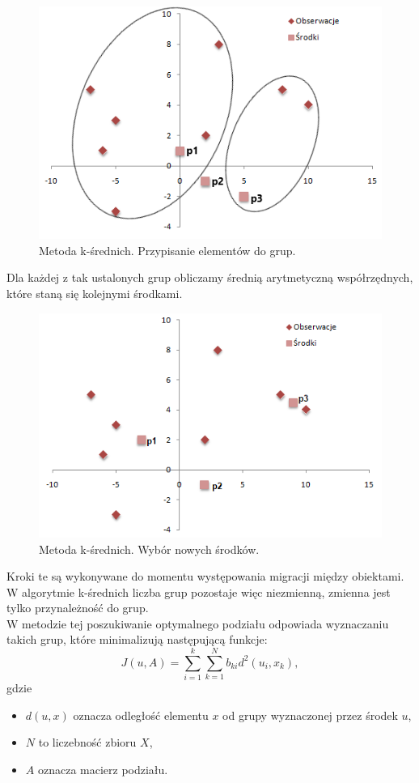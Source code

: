 \documentclass[12pt,a4paper]{report}
\begin{document}
\begin{center}
\begin{figure}[H]
\centering
\includegraphics[scale=0.8]{ks_1.png} 
\caption{Metoda k-średnich. Przypisanie elementów do grup.}
\end{figure}
\end{center}
Dla każdej z tak ustalonych grup obliczamy średnią arytmetyczną współrzędnych, które staną się kolejnymi środkami.
\begin{center}
\begin{figure}[H]
\centering
\includegraphics[scale=0.8]{ks_2.png} 
\caption{Metoda k-średnich. Wybór nowych środków.}
\end{figure}
\end{center}
Kroki te są wykonywane do momentu występowania migracji między obiektami.
\\W algorytmie k-średnich liczba grup pozostaje więc niezmienną, zmienna jest tylko przynależność do grup.
\\W metodzie tej poszukiwanie optymalnego podziału odpowiada wyznaczaniu takich grup, które minimalizują następującą funkcje:
$$J(u,A) = \sum_{i=1}^k \sum_{k=1}^N b_{ki}d^2(u_i,x_k),$$
gdzie 
\begin{itemize}
\item $d(u,x)$ oznacza odległość elementu $x$ od grupy wyznaczonej przez środek $u$,
\item $N$ to liczebność zbioru $X$,
\item $A$ oznacza macierz podziału.
\end{itemize}
 
\end{document}
